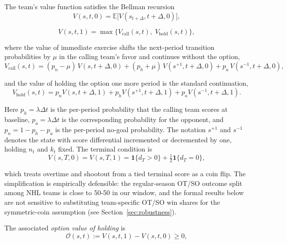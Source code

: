 \documentclass[11pt]{article}
\begin{document}
The team's value function satisfies the Bellman recursion
\begin{equation}
V(s, t, 0) = \mathbb{E}\bigl[V(s_{t+\Delta}, t+\Delta, 0)\bigr],
\end{equation}

\begin{equation}
V(s, t, 1) = \max\bigl\{ V_{\mathrm{call}}(s, t),\; V_{\mathrm{hold}}(s, t) \bigr\},
\end{equation}

\noindent where the value of immediate exercise shifts the next-period transition probabilities by $\mu$ in the calling team's favor and continues without the option,
\begin{equation}
V_{\mathrm{call}}(s, t) = (p_n - \mu)\, V(s, t+\Delta, 0) + (p_h + \mu)\, V(s^{+1}, t+\Delta, 0) + p_a\, V(s^{-1}, t+\Delta, 0),
\end{equation}

\noindent and the value of holding the option one more period is the standard continuation,
\begin{equation}
V_{\mathrm{hold}}(s, t) = p_n V(s, t+\Delta, 1) + p_h V(s^{+1}, t+\Delta, 1) + p_a V(s^{-1}, t+\Delta, 1).
\end{equation}

\noindent Here $p_h = \lambda \Delta t$ is the per-period probability that the calling team scores at baseline, $p_a = \lambda \Delta t$ is the corresponding probability for the opponent, and $p_n = 1 - p_h - p_a$ is the per-period no-goal probability. The notation $s^{+1}$ and $s^{-1}$ denotes the state with score differential incremented or decremented by one, holding $n_t$ and $k_t$ fixed. The terminal condition is
\begin{equation}
V(s, T, 0) = V(s, T, 1) = \mathbf{1}\{d_T > 0\} + \tfrac{1}{2}\mathbf{1}\{d_T = 0\},
\end{equation}

\noindent which treats overtime and shootout from a tied terminal score as a coin flip. The simplification is empirically defensible: the regular-season OT/SO outcome split among NHL teams is close to 50-50 in our window, and the formal results below are not sensitive to substituting team-specific OT/SO win shares for the symmetric-coin assumption (see Section~\ref{sec:robustness}).

The associated \emph{option value of holding} is
\begin{equation}
\mathcal{O}(s, t) := V(s, t, 1) - V(s, t, 0) \geq 0,
\end{equation}
\end{document}
